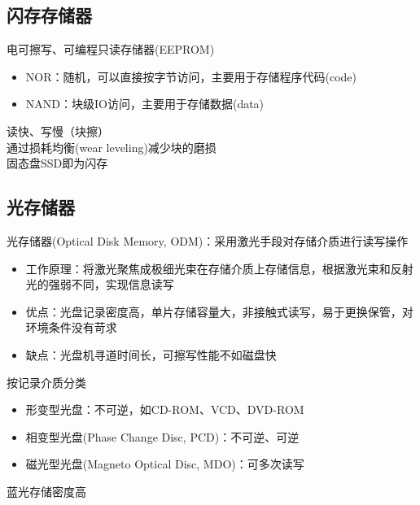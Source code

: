 \subsection{闪存存储器}
电可擦写、可编程只读存储器(EEPROM)
\begin{itemize}
	\item NOR：随机，可以直接按字节访问，主要用于存储程序代码(code)
	\item NAND：块级IO访问，主要用于存储数据(data)
\end{itemize}
读快、写慢（块擦）\\
通过损耗均衡(wear leveling)减少块的磨损\\
固态盘SSD即为闪存

\subsection{光存储器}
光存储器(Optical Disk Memory, ODM)：采用激光手段对存储介质进行读写操作
\begin{itemize}
	\item 工作原理：将激光聚焦成极细光束在存储介质上存储信息，根据激光束和反射光的强弱不同，实现信息读写
	\item 优点：光盘记录密度高，单片存储容量大，非接触式读写，易于更换保管，对环境条件没有苛求
	\item 缺点：光盘机寻道时间长，可擦写性能不如磁盘快
\end{itemize}
按记录介质分类
\begin{itemize}
	\item 形变型光盘：不可逆，如CD-ROM、VCD、DVD-ROM
	\item 相变型光盘(Phase Change Disc, PCD)：不可逆、可逆
	\item 磁光型光盘(Magneto Optical Disc, MDO)：可多次读写
\end{itemize}
蓝光存储密度高


